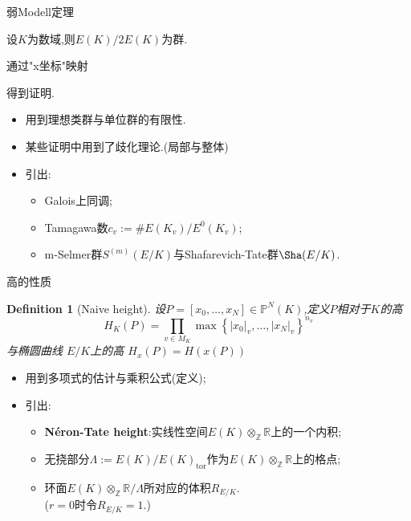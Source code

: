\documentclass[pdf]{beamer}
\numberwithin{equation}{section}
\theoremstyle{plain}
\newtheorem{defn}[theorem]{Definition}
\theoremstyle{plain}
\theoremstyle{plain}
\theoremstyle{remark}
\DeclareMathOperator{\tor}{\operatorname{tor}}
\begin{document}
\begin{frame}[fragile]{弱Modell定理}
\begin{theorem}[高的性质]
	\hspace*{20pt}设$K$为数域,则$E(K)/2E(K)$为群.
\end{theorem}
通过"x坐标"映射\begin{center}
\end{center}
得到证明.
\begin{itemize}	
\item 用到理想类群与单位群的有限性.
\item 某些证明中用到了歧化理论.(局部与整体)
\item 引出: 
\begin{itemize}
	\item Galois上同调;
	\item Tamagawa数$c_v:=\#E(K_v)/E^0(K_v)$;
	\item m-Selmer群$S^{(m)}(E/K)$与Shafarevich-Tate群$\Sha(E/K)$.
\end{itemize}
\end{itemize}
\end{frame}
\begin{frame}[fragile]{高的性质}
\begin{defn}[Naive height]
	设$P=[x_0, \ldots, x_N] \in \mathbb{P}^N(K)$,定义$P$相对于$K$的高
	$$H_K(P)=\prod_{v \in M_K} \max \left\{|x_0|_v, \ldots , |x_N|_v \right\}^{n_v}$$
与椭圆曲线 $E/K$上的高
	$H_x(P)=H(x(P))$
\end{defn}
\begin{itemize}	
	\item 用到多项式的估计与乘积公式(定义);
	\item 引出: 
	\begin{itemize}
		\item \textbf{Néron-Tate height}:实线性空间$E(K) \otimes_{\mathbb{Z}}\mathbb{R}$上的一个内积;
		\item 无挠部分$\Lambda :=E(K)/E(K)_{\tor}$作为$E(K) \otimes_{\mathbb{Z}}\mathbb{R}$上的格点;
		\item 环面$E(K)\otimes_{\mathbb{Z}}\mathbb{R}/\Lambda$所对应的体积$R_{E/K}$.\\($r=0$时令$R_{E/K}=1$.)
	\end{itemize}
\end{itemize}
\end{frame}
\end{document}

